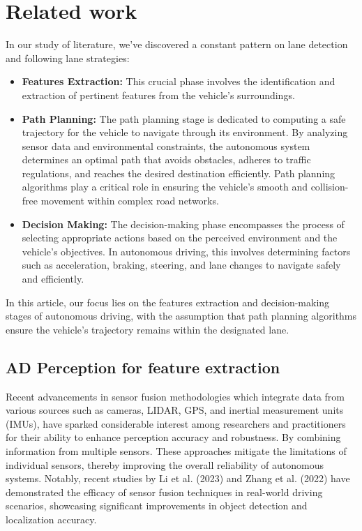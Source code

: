 \documentclass[conference]{IEEEtran}
\begin{document}
\section{Related work}

In our study of literature, we've discovered a constant pattern on lane detection and following lane strategies:

\begin{itemize}
\item \textbf{Features Extraction:} This crucial phase involves the identification and extraction of pertinent features from the vehicle's surroundings.

\item \textbf{Path Planning:} The path planning stage is dedicated to computing a safe trajectory for the vehicle to navigate through its environment. By analyzing sensor data and environmental constraints, the autonomous system determines an optimal path that avoids obstacles, adheres to traffic regulations, and reaches the desired destination efficiently. Path planning algorithms play a critical role in ensuring the vehicle's smooth and collision-free movement within complex road networks.

\item \textbf{Decision Making:} The decision-making phase encompasses the process of selecting appropriate actions based on the perceived environment and the vehicle's objectives. In autonomous driving, this involves determining factors such as acceleration, braking, steering, and lane changes to navigate safely and efficiently.
\end{itemize}

In this article, our focus lies on the features extraction and decision-making stages of autonomous driving, with the assumption that path planning algorithms ensure the vehicle's trajectory remains within the designated lane.

\subsection{AD Perception for feature extraction}

Recent advancements in sensor fusion methodologies 
which integrate data from various sources such as cameras, LIDAR, GPS, and inertial measurement units (IMUs), have sparked considerable interest among researchers and practitioners for their ability to enhance perception accuracy and robustness. By combining information from multiple sensors. These approaches mitigate the limitations of individual sensors, thereby improving the overall reliability of autonomous systems. Notably, recent studies by Li et al. (2023) and Zhang et al. (2022) have demonstrated the efficacy of sensor fusion techniques in real-world driving scenarios, showcasing significant improvements in object detection and localization accuracy.
\end{document}
